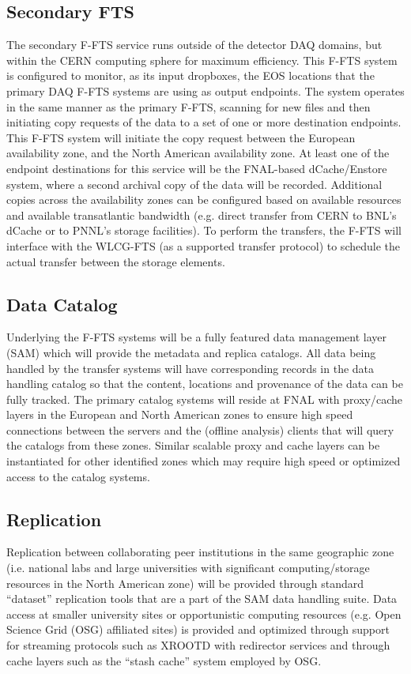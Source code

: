 \documentclass[pdftex,12pt,letter]{article}
\begin{document}
\subsection{Secondary FTS}
The secondary F-FTS service runs outside of the detector DAQ domains, but within the CERN computing sphere for maximum efficiency.
This F-FTS system is configured to monitor, as its input dropboxes, the EOS locations that the primary DAQ F-FTS systems are using as output endpoints.
The system operates in the same manner as the primary F-FTS, scanning for new files and then initiating copy requests of the data to a set of one or more destination endpoints.
This F-FTS system will initiate the copy request between the European availability zone, and the North American availability zone.  At least one of the endpoint destinations for
this service will be the FNAL-based dCache/Enstore system, where a second archival copy of the data will be recorded.  Additional copies across the availability zones can be
configured based on available resources and available transatlantic bandwidth (e.g. direct transfer from CERN to BNL’s dCache or to PNNL’s storage facilities). 
To perform the transfers, the F-FTS will interface with the WLCG-FTS (as a supported transfer protocol) to schedule the actual transfer between the storage elements.  



\subsection{Data Catalog}
Underlying the F-FTS systems will be a fully featured data management layer (SAM) which will provide the metadata and replica catalogs.
All data being handled by the transfer systems will have corresponding records in the data handling catalog so that the content,
locations and provenance of the data can be fully tracked.  The primary catalog systems will reside at FNAL with proxy/cache
layers in the European and North American zones to ensure high speed connections between the servers and the (offline analysis)
clients that will query the catalogs from these zones.  Similar scalable proxy and cache layers can be instantiated for other identified
zones which may require high speed or optimized access to the catalog systems.
 
\subsection{Replication}
Replication between collaborating peer institutions in the same geographic zone  (i.e. national labs and large universities with significant computing/storage resources in the North American zone) will be provided through standard “dataset” replication tools that are a part of the SAM data handling suite.  Data access at smaller university sites or opportunistic computing resources (e.g. Open Science Grid (OSG) affiliated sites) is provided and optimized through support for streaming protocols such as XROOTD with redirector services and through cache layers such as the “stash cache” system employed by OSG.  
\end{document}
